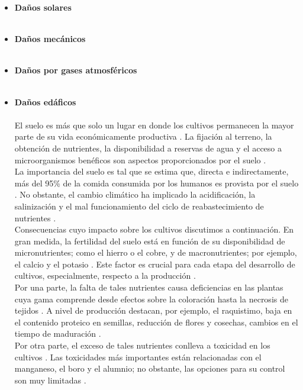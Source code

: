 \begin{itemize}[leftmargin=0cm, itemsep=0.5 cm]

\item[]\textbf{Daños solares\\}\\
\item[]\textbf{Daños mecánicos\\}\\
\item[]\textbf{Daños por gases atmosféricos\\}\\
\item[]\textbf{Daños edáficos\\}\\
El suelo es más que solo un lugar en donde los cultivos permanecen la mayor parte de su vida económicamente productiva \cite{Passioura_2002}. La fijación al terreno, la obtención de nutrientes, la disponibilidad a reservas de agua y el acceso a microorganismos benéficos son aspectos proporcionados por el suelo \cite{Hatfield_2017}.\\

La importancia del suelo es tal que se estima que, directa e indirectamente, más del 95\% de la comida consumida por los humanos es provista por el suelo \cite{Kopittke_2019}. No obstante, el cambio climático ha implicado la acidificación, la salinización y el mal funcionamiento del ciclo de reabastecimiento de nutrientes \cite{Hamidov_2018}.\\

Consecuencias cuyo impacto sobre los cultivos discutimos a continuación. En gran medida, la fertilidad del suelo está en función de su disponibilidad de micronutrientes; como el hierro o el cobre, y de macronutrientes; por ejemplo, el calcio y el potasio \cite{Berbecea_2024}. Este factor es crucial para cada etapa del desarrollo de cultivos, especialmente, respecto a la producción \cite{Wang_2014}.\\

Por una parte, la falta de tales nutrientes causa deficiencias en las plantas cuya gama comprende desde efectos sobre la coloración hasta la necrosis de tejidos \cite{Uchida_2000}. A nivel de producción destacan, por ejemplo, el raquistimo, baja en el contenido proteico en semillas, reducción de flores y cosechas, cambios en el tiempo de maduración \cite{Uchida_2000}.\\

Por otra parte, el exceso de tales nutrientes conlleva a toxicidad en los cultivos \cite{Ngoune_2020}. Las toxicidades más importantes están relacionadas con el manganeso, el boro y el alumnio; no obstante, las opciones para su control son muy limitadas \cite{Langridge_2022}.\\ 


\end{itemize}
